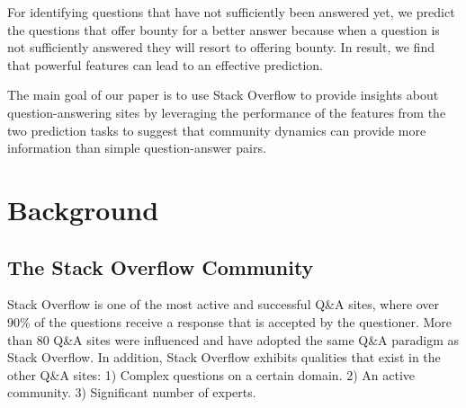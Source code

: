 For identifying questions that have not sufficiently been answered yet, we predict the questions that offer bounty for a better answer because when a question is not sufficiently answered they will resort to offering bounty. In result, we find that powerful features can lead to an effective prediction.


The main goal of our paper is to use Stack Overflow to provide insights about question-answering sites by leveraging the performance of the features from the two prediction tasks to suggest that community dynamics can provide more information than simple question-answer pairs. 

\section{Background}
\subsection{The Stack Overflow Community}
	Stack Overflow is one of the most active and successful Q\&A sites, where over 90\% of the questions receive a response that is accepted by the questioner. More than 80 Q\&A sites were influenced and have adopted the same Q\&A paradigm as Stack Overflow. In addition, Stack Overflow exhibits qualities that exist in the other Q\&A sites: 1) Complex questions on a certain domain. 2) An active community. 3) Significant number of experts.









